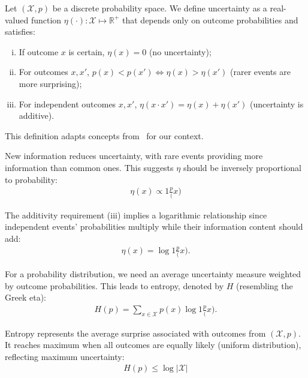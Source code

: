 \begin{definition}
	Let $(\mathcal{X}, p)$ be a discrete probability space. We define \textnormal{\sffamily uncertainty} as a real-valued function $\eta(\cdot): \mathcal{X} \mapsto \mathbb{R}^+$ that depends only on outcome probabilities and satisfies:
	\begin{enumerate}[(i)]
		\item If outcome $x$ is certain, $\eta(x) = 0$ (no uncertainty);
		\item For outcomes $x, x'$, $p(x) < p(x') \iff \eta(x) > \eta(x')$ (rarer events are more surprising);
		\item For independent outcomes $x, x'$, $\eta(x \cdot x') = \eta(x) + \eta(x')$ (uncertainty is additive).
	\end{enumerate}
\end{definition}
\begin{remark}
	This definition adapts concepts from~\cite{ref:martin-2011} for our context.
\end{remark}

New information reduces uncertainty, with rare events providing more information than common ones. This suggests $\eta$ should be inversely proportional to probability:
\begin{align}
	\label{eq:eta-1}
	\eta(x) \propto {1 \frac p(x)}
\end{align}

The additivity requirement (iii) implies a logarithmic relationship since independent events' probabilities multiply while their information content should add:
\begin{align}
	\label{eq:eta-3}
	\eta(x) = \log{1 \frac p(x)}.
\end{align}

For a probability distribution, we need an average uncertainty measure weighted by outcome probabilities. This leads to entropy, denoted by $H$ (resembling the Greek eta):
\begin{align}
	\label{eq:eta-almost}
	H(p) = \sum_{x \in \mathcal{X}} p(x) \log{1 \frac p(x)}.
\end{align}

Entropy represents the average surprise associated with outcomes from $(\mathcal{X}, p)$. It reaches maximum when all outcomes are equally likely (uniform distribution), reflecting maximum uncertainty:
\begin{align}
	\label{eq:eta-2}
	H(p) \leq \log{|\mathcal{X}|}
\end{align}

